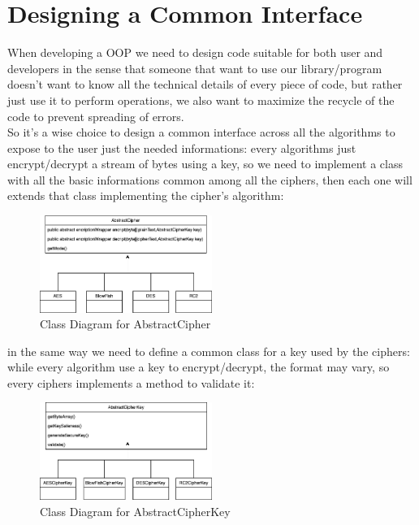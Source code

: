 \documentclass{article}
\begin{document}
		\section{Designing a Common Interface}\label{sec:designcInterface}
		
		When developing a OOP we need to design code suitable for both user and developers in the sense that someone that want to use our library/program doesn't want to know all the technical details of every piece of code, but rather just use it to perform operations, we also want to maximize the recycle of the code to prevent spreading of errors.\\ So it's a wise choice to design a common interface across all the algorithms to expose to the user just the needed informations: every algorithms just encrypt/decrypt a stream of bytes using a key, so we need to implement a class with all the basic informations common among all the ciphers, then each one will extends that class implementing the cipher's algorithm:
		
		\begin{figure}[h]
		\includegraphics[width=0.5\textwidth ]{images/AbstractCipher.png}
		\centering
		\caption{Class Diagram for AbstractCipher}
	\end{figure}

in the same way we need to define a common class for a key used by the ciphers: while every algorithm use a key to encrypt/decrypt, the format may vary, so every ciphers implements a method to validate it:

		
		\begin{figure}[h]
		\includegraphics[width=0.5\textwidth ]{images/AbstractKey.png}
		\centering
		\caption{Class Diagram for AbstractCipherKey}
		\end{figure}
\end{document}
